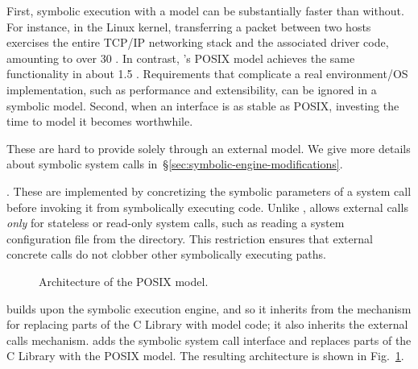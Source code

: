  First, symbolic execution with a model can be substantially faster than without.  For instance, in the Linux kernel, transferring a packet between two hosts exercises the entire TCP/IP networking stack and the associated driver code, amounting to over 30 \kloc.  In contrast, \cnine's POSIX model achieves the same functionality in about 1.5 \kloc. Requirements that complicate a real environment/OS implementation, such as performance and extensibility, can be ignored in a symbolic model. Second, when an interface is as stable as POSIX, investing the time to model it becomes worthwhile.

  These are hard to provide solely through an external model. We give more details about symbolic system calls in~\S\ref{sec:symbolic-engine-modifications}.

.  These are implemented by concretizing the symbolic parameters of a system call before invoking it from symbolically executing code. Unlike \cite{dart,klee,exe}, \cnine allows external calls \emph{only} for stateless or read-only system calls, such as reading a system configuration file from the  directory.  This restriction ensures that external concrete calls do not clobber other symbolically executing paths.

\begin{figure}[h!]
  \centering
  \caption{Architecture of the \cnine POSIX model.}
  \label{fig:posixmodel}
\end{figure}

\cnine builds upon the \klee symbolic execution engine, and so it inherits from \klee the mechanism for replacing parts of the C Library with model code; it also inherits the external calls mechanism.  \cnine adds the symbolic system call interface and replaces parts of the C Library with the POSIX model.  The resulting architecture is shown in Fig.~\ref{fig:posixmodel}.

\newcommand{\cI}{\!{\raisebox{-0.2ex}{\large\ding{192}}}\xspace}
\newcommand{\cII}{\!{\raisebox{-0.2ex}{\large\ding{193}}}\xspace}
\newcommand{\cIII}{\!{\raisebox{-0.2ex}{\large\ding{194}}}\xspace}
\newcommand{\cIV}{\!{\raisebox{-0.2ex}{\large\ding{195}}}\xspace}
\newcommand{\cV}{\!{\raisebox{-0.2ex}{\large\ding{196}}}\xspace}
\newcommand{\cVI}{\!{\raisebox{-0.2ex}{\large\ding{197}}}\xspace}
\newcommand{\cVII}{\!{\raisebox{-0.2ex}{\large\ding{198}}}\xspace}
\newcommand{\cVIII}{\!{\raisebox{-0.2ex}{\large\ding{199}}}\xspace}

